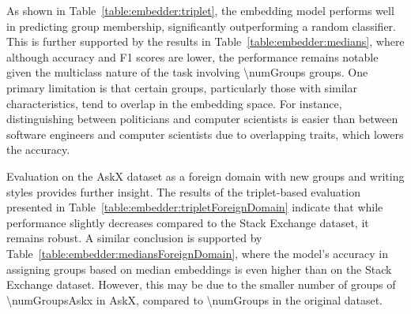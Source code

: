 As shown in Table~\ref{table:embedder:triplet}, the embedding model performs well in predicting group membership, significantly outperforming a random classifier. This is further supported by the results in Table~\ref{table:embedder:medians}, where although accuracy and F1 scores are lower, the performance remains notable given the multiclass nature of the task involving \num{\numGroups} groups. One primary limitation is that certain groups, particularly those with similar characteristics, tend to overlap in the embedding space. For instance, distinguishing between politicians and computer scientists is easier than between software engineers and computer scientists due to overlapping traits, which lowers the accuracy.

Evaluation on the AskX dataset as a foreign domain with new groups and writing styles provides further insight. The results of the triplet-based evaluation presented in Table~\ref{table:embedder:tripletForeignDomain} indicate that while performance slightly decreases compared to the Stack Exchange dataset, it remains robust. A similar conclusion is supported by Table~\ref{table:embedder:mediansForeignDomain}, where the model's accuracy in assigning groups based on median embeddings is even higher than on the Stack Exchange dataset. However, this may be due to the smaller number of groups of \num{\numGroupsAskx} in AskX, compared to \num{\numGroups} in the original dataset.

